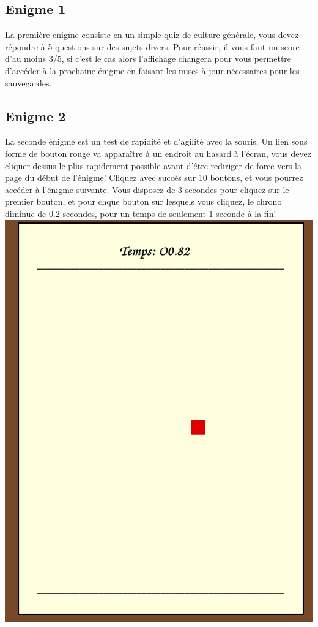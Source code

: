 \documentclass[12pt,a4paper]{article}
\begin{document}
\subsection{Enigme 1}
La première enigme consiste en un simple quiz de culture générale, vous devez répondre à 5 questions sur des sujets divers. Pour réussir, il vous faut un score d'au moins 3/5, si c'est le cas alors l'affichage changera pour vous permettre d'accéder à la prochaine énigme en faisant les mises à jour nécessaires pour les sauvegardes.

\newpage
\subsection{Enigme 2}
La seconde énigme est un test de rapidité et d'agilité avec la souris. Un lien sous forme de bouton rouge va apparaître à un endroit au hasard à l'écran, vous devez cliquer dessus le plus rapidement possible avant d'être rediriger de force vers la page du début de l'énigme! Cliquez avec succès sur 10 boutons, et vous pourrez accéder à l'énigme suivante. Vous disposez de 3 secondes pour cliquez sur le premier bouton, et pour chque bouton sur lesquels vous cliquez, le chrono diminue de 0.2 secondes, pour un temps de seulement 1 seconde à la fin! \\

\includegraphics[scale=0.5]{enigme2.png}
\end{document}
